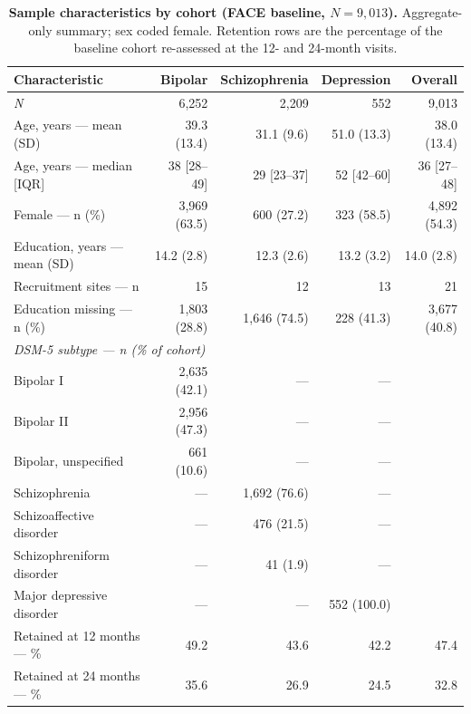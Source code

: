 \begin{table}[htbp]
\centering
\caption{\textbf{Sample characteristics by cohort (FACE baseline, $N=9{,}013$).}
Aggregate-only summary; sex coded female. Retention rows are the percentage of the
baseline cohort re-assessed at the 12- and 24-month visits.}
\label{tab:characteristics}
\small
\begin{tabular}{l r r r r}
\toprule
Characteristic & Bipolar & Schizophrenia & Depression & Overall \\
\midrule
\textit{N} & 6{,}252 & 2{,}209 & 552 & 9{,}013 \\
Age, years --- mean (SD) & 39.3 (13.4) & 31.1 (9.6) & 51.0 (13.3) & 38.0 (13.4) \\
Age, years --- median [IQR] & 38 [28--49] & 29 [23--37] & 52 [42--60] & 36 [27--48] \\
Female --- n (\%) & 3{,}969 (63.5) & 600 (27.2) & 323 (58.5) & 4{,}892 (54.3) \\
Education, years --- mean (SD) & 14.2 (2.8) & 12.3 (2.6) & 13.2 (3.2) & 14.0 (2.8) \\
Recruitment sites --- n & 15 & 12 & 13 & 21 \\
Education missing --- n (\%) & 1{,}803 (28.8) & 1{,}646 (74.5) & 228 (41.3) & 3{,}677 (40.8) \\
\midrule
\multicolumn{5}{l}{\textit{DSM-5 subtype --- n (\% of cohort)}}\\
\quad Bipolar I & 2{,}635 (42.1) & --- & --- & \\
\quad Bipolar II & 2{,}956 (47.3) & --- & --- & \\
\quad Bipolar, unspecified & 661 (10.6) & --- & --- & \\
\quad Schizophrenia & --- & 1{,}692 (76.6) & --- & \\
\quad Schizoaffective disorder & --- & 476 (21.5) & --- & \\
\quad Schizophreniform disorder & --- & 41 (1.9) & --- & \\
\quad Major depressive disorder & --- & --- & 552 (100.0) & \\
\midrule
Retained at 12 months --- \% & 49.2 & 43.6 & 42.2 & 47.4 \\
Retained at 24 months --- \% & 35.6 & 26.9 & 24.5 & 32.8 \\
\bottomrule
\end{tabular}
\end{table}
